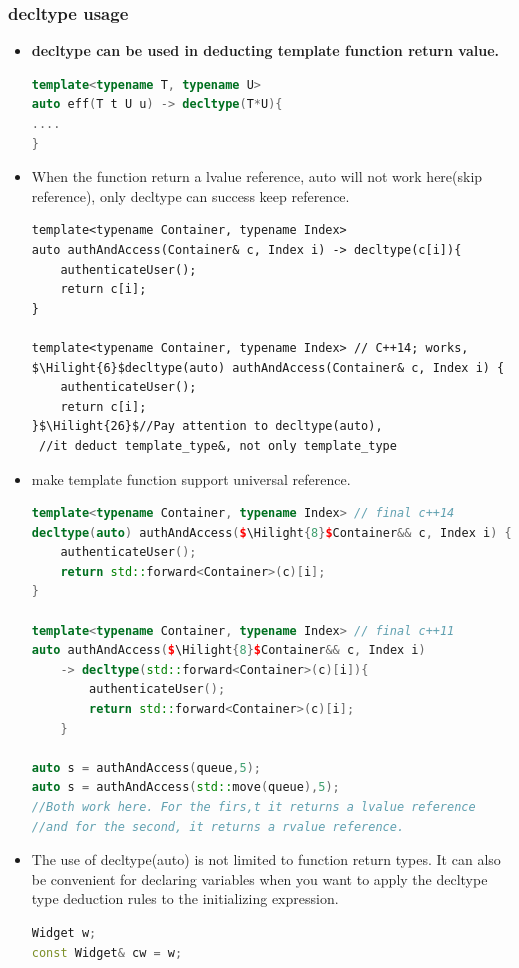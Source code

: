 \documentclass[a4paper,11pt,twoside]{book}
\newcommand{\Hilight}[1]{\makebox[0pt][l]{\color{yellow}\rule[-3pt]{#1em}{11pt}}}
\newcommand{\Hilight}[1]{}
\begin{document}
\subsubsection{decltype usage}
\begin{itemize}
	
	\item \textbf{decltype can be used in deducting template function return value.}
\begin{lstlisting}[frame=single, language=c++, mathescape=true]
template<typename T, typename U>
auto eff(T t U u) -> decltype(T*U){
....
}
\end{lstlisting}
	\item When the function return a lvalue reference, auto will not work here(skip reference), only decltype can success keep reference.
\begin{lstlisting}
template<typename Container, typename Index>
auto authAndAccess(Container& c, Index i) -> decltype(c[i]){
	authenticateUser();
	return c[i];
}

template<typename Container, typename Index> // C++14; works,
$\Hilight{6}$decltype(auto) authAndAccess(Container& c, Index i) {
	authenticateUser();
	return c[i];
}$\Hilight{26}$//Pay attention to decltype(auto), 
 //it deduct template_type&, not only template_type
\end{lstlisting}
	
	\item make template function support universal reference.
\begin{lstlisting}[frame=single, language=c++, mathescape=true]
template<typename Container, typename Index> // final c++14
decltype(auto) authAndAccess($\Hilight{8}$Container&& c, Index i) {
	authenticateUser();
	return std::forward<Container>(c)[i];
}
	
template<typename Container, typename Index> // final c++11
auto authAndAccess($\Hilight{8}$Container&& c, Index i)
	-> decltype(std::forward<Container>(c)[i]){
		authenticateUser();
		return std::forward<Container>(c)[i];
	}

auto s = authAndAccess(queue,5);
auto s = authAndAccess(std::move(queue),5); 
//Both work here. For the firs,t it returns a lvalue reference
//and for the second, it returns a rvalue reference.
\end{lstlisting}
	
	\item The use of decltype(auto) is not limited to function return types. It can also be convenient for declaring variables when you want to apply the decltype type deduction rules to the initializing expression.
\begin{lstlisting}[frame=single, language=c++, mathescape=true]
Widget w;
const Widget& cw = w;
	

\end{lstlisting}
\end{itemize}
\end{document}
